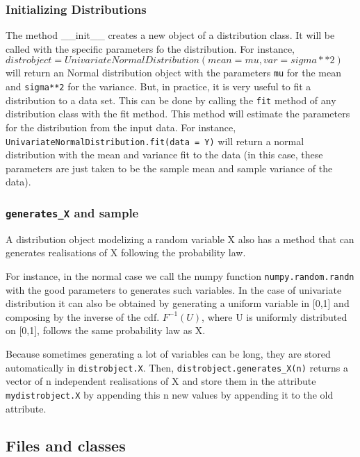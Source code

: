\documentclass{article}
\begin{document}
	\subsubsection{Initializing Distributions}

	The method \_\_init\_\_ creates a new object of a distribution class. It will be called with the specific parameters fo the distribution. For instance, $distrobject = UnivariateNormalDistribution(mean=mu,var=sigma**2)$ will return an Normal distribution object with the parameters \texttt{mu} for the mean and \texttt{sigma**2} for the variance.
	But, in practice, it is very useful to fit a distribution to a data set.
	This can be done by calling the \texttt{fit} method of any distribution class with the fit method.
	This method will estimate the parameters for the distribution from the
	input data. For instance, \texttt{UnivariateNormalDistribution.fit(data = Y)} will return a normal distribution with the
	mean and variance fit to the data (in this case, these parameters are
	just taken to be the sample mean and sample variance of the data).

	\subsubsection{\texttt{generates\_X} and sample}

	A distribution object modelizing a random variable X also has a method that can generates realisations of X following the probability law.

	For instance, in the normal case we call the numpy function \texttt{numpy.random.randn} with the good parameters to generates such variables. In the case of univariate distribution it can also be obtained by generating a uniform variable in [0,1] and composing by the inverse of the cdf. $F^{-1}(U)$, where U is uniformly distributed on [0,1], follows the same probability law as X.

	Because sometimes generating a lot of variables can be long, they are stored automatically in \texttt{distrobject.X}. Then,  \texttt{distrobject.generates\_X(n)} returns a vector of n independent realisations of X and store them in the attribute \texttt{mydistrobject.X} by appending this n new values by appending it to the old attribute.


	 \subsection{Files and classes}
\end{document}
